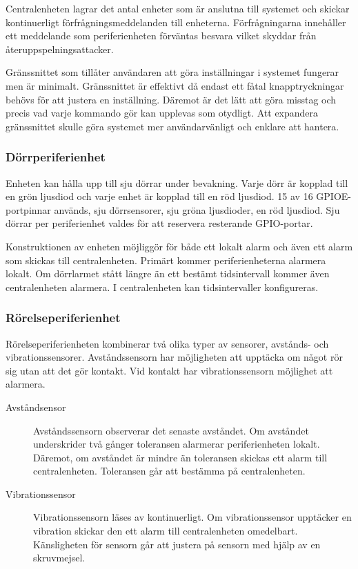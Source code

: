 \documentclass[a4paper]{article}
\begin{document}
Centralenheten lagrar det antal enheter som är anslutna till systemet och skickar kontinuerligt förfrågningsmeddelanden till enheterna.
Förfrågningarna innehåller ett meddelande som periferienheten förväntas besvara vilket skyddar från återuppspelningsattacker.

Gränssnittet som tillåter användaren att göra inställningar i systemet fungerar men är minimalt.
Gränssnittet är effektivt då endast ett fåtal knapptryckningar behövs för att justera en inställning.
Däremot är det lätt att göra misstag och precis vad varje kommando gör kan upplevas som otydligt.
Att expandera gränssnittet skulle göra systemet mer användarvänligt och enklare att hantera.

\subsubsection{Dörrperiferienhet}
Enheten kan hålla upp till sju dörrar under bevakning.
Varje dörr är kopplad till en grön ljusdiod och varje enhet är kopplad till en röd ljusdiod.
15 av 16 GPIOE-portpinnar används, sju dörrsensorer, sju gröna ljusdioder, en röd ljusdiod.
Sju dörrar per periferienhet valdes för att reservera resterande GPIO-portar.

Konstruktionen av enheten möjliggör för både ett lokalt alarm och även ett alarm som skickas till centralenheten.
Primärt kommer periferienheterna alarmera lokalt.
Om dörrlarmet stått längre än ett bestämt tidsintervall kommer även centralenheten alarmera.
I centralenheten kan tidsintervaller konfigureras.

\subsubsection{Rörelseperiferienhet}
Rörelseperiferienheten kombinerar två olika typer av sensorer, avstånds- och vibrationssensorer.
Avståndssensorn har möjligheten att upptäcka om något rör sig utan att det gör kontakt.
Vid kontakt har vibrationssensorn möjlighet att alarmera.

\begin{description}
  \item[Avståndsensor] Avståndssensorn observerar det senaste avståndet.
  Om avståndet underskrider två gånger toleransen alarmerar periferienheten lokalt.
  Däremot, om avståndet är mindre än toleransen skickas ett alarm till centralenheten.
  Toleransen går att bestämma på centralenheten.

  \item[Vibrationssensor] Vibrationssensorn läses av kontinuerligt.
  Om vibrationssensor upptäcker en vibration skickar den ett alarm till centralenheten omedelbart.
  Känsligheten för sensorn går att justera på sensorn med hjälp av en skruvmejsel.

  \end{description}
\end{document}
